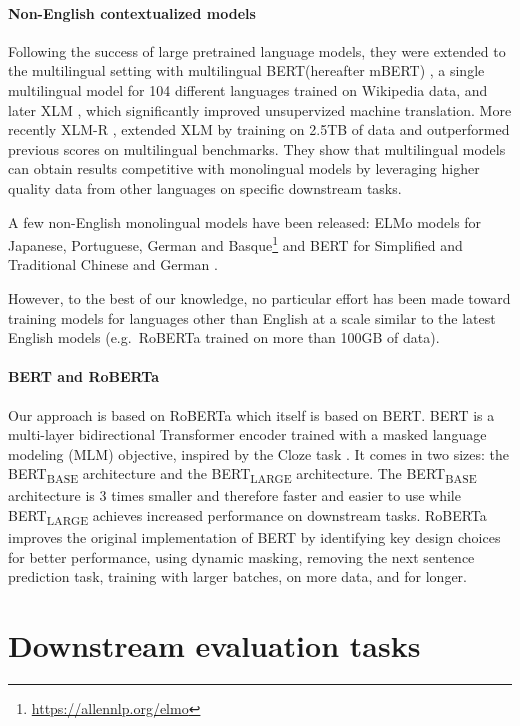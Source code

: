 \documentclass[11pt,a4paper]{article}
\newcommand{\roberta}{RoBERTa\xspace}
\newcommand{\bert}{BERT\xspace}
\newcommand{\mbert}{mBERT\xspace}
\newcommand{\bertbase}{BERT\textsubscript{BASE}\xspace}
\newcommand{\bertlarge}{BERT\textsubscript{LARGE}\xspace}
\begin{document}
 
\paragraph{Non-English contextualized models}
\label{contextualmodelsforotherlanguages}
Following the success of large pretrained language models, they were extended to the multilingual setting with multilingual \bert (hereafter \mbert) \cite{devlin2018mbert}, a single multilingual model for 104 different languages trained on Wikipedia data, and later XLM \cite{lample2019cross}, which significantly improved unsupervized machine translation.
More recently XLM-R \cite{conneau2019xlmr}, extended XLM by training on 2.5TB of data and outperformed previous scores on multilingual benchmarks. They show that multilingual models can obtain results competitive with monolingual models by leveraging higher quality data from other languages on specific downstream tasks.

A few non-English monolingual models have been released: ELMo models for Japanese, Portuguese, German and Basque\footnote{\url{https://allennlp.org/elmo}} and BERT for Simplified and Traditional Chinese \cite{devlin2018mbert} and German \cite{chan2019german}.

However, to the best of our knowledge, no particular effort has been made toward training models for languages other than English at a scale similar to the latest English models (e.g.~\roberta trained on more than 100GB of data).

\paragraph{BERT and RoBERTa}
Our approach is based on \roberta \cite{liu2019roberta} which itself is based on \bert \cite{devlin2019bert}.
\bert is a multi-layer bidirectional Transformer encoder trained with a masked language modeling (MLM) objective, inspired by the Cloze task \cite{taylor1953cloze}.
It comes in two sizes: the \bertbase architecture and the \bertlarge architecture. The \bertbase architecture is 3 times smaller and therefore faster and easier to use while \bertlarge achieves increased performance on downstream tasks.
\roberta improves the original implementation of \bert by identifying key design choices for better performance, using dynamic masking, removing the next sentence prediction task, training with larger batches, on more data, and for longer.


\section{Downstream evaluation tasks}
\end{document}
